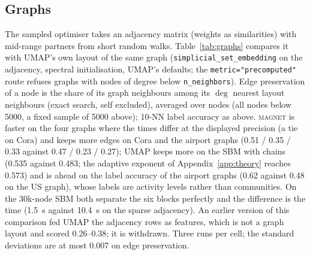 \documentclass[11pt]{article}
\newcommand{\magnet}{\textsc{magnet}}
\begin{document}
\begin{table}[t]
\centering\small
\caption{The matched post-process control (\texttt{k41}): geometric mean of the ratios to the frozen unprocessed
references on 15-NN, Spearman and $k$-means ARI (two axes on letter and covertype, whose classes are not
clusters), computed per run and averaged over five end-to-end seeds, for every configuration as shipped (plain)
and with the identical post-process (+ post); last column, the four-set mean of the post-processed values; best per column in bold, second underlined. Run
standard deviations are 0.000--0.03 (0.05 for the hybrid's MNIST minimum with the step); the paired differences are in the text. Best per column in bold, second underlined, among the ranked
configurations; PCA-2 and PCA-2 refined by our pass are reference rows below the rule.}
\label{tab:composite_geo}
\resizebox{\textwidth}{!}{}
\end{table}

\begin{table}[t]
\centering\small
\caption{Same as Table~\ref{tab:composite_geo} with the minimum of the ratios.}
\label{tab:composite_min}
\resizebox{\textwidth}{!}{}
\end{table}

\subsection{Graphs}
The sampled optimiser takes an adjacency matrix (weights as similarities) with mid-range partners from
short random walks. Table~\ref{tab:graphs} compares it with UMAP's own layout of the same graph
(\texttt{simplicial\_set\_embedding} on the adjacency, spectral initialisation, UMAP's defaults; the
\texttt{metric="precomputed"} route refuses graphs with nodes of degree below \texttt{n\_neighbors}).
Edge preservation of a node is the share of its graph neighbours among its $\deg$ nearest layout
neighbours (exact search, self excluded), averaged over nodes (all nodes below 5000, a fixed sample of
5000 above); 10-NN label accuracy as above. \magnet{} is faster on the four graphs where the times
differ at the displayed precision (a tie on Cora) and keeps more edges on Cora and the airport graphs
(0.51 / 0.35 / 0.33 against 0.47 / 0.23 / 0.27); UMAP keeps more on the SBM with chains (0.535 against
0.483; the adaptive exponent of Appendix~\ref{app:theory} reaches 0.573) and is ahead on the label
accuracy of the airport graphs (0.62 against 0.48 on the US graph), whose labels are activity levels
rather than communities. On the 30k-node SBM both separate the six blocks perfectly and the difference
is the time (1.5~s against 10.4~s on the sparse adjacency). An earlier version of this comparison fed
UMAP the adjacency rows as features, which is not a graph layout and scored 0.26--0.38; it is
withdrawn. Three runs per cell; the standard deviations are at most 0.007 on edge preservation.
\end{document}
